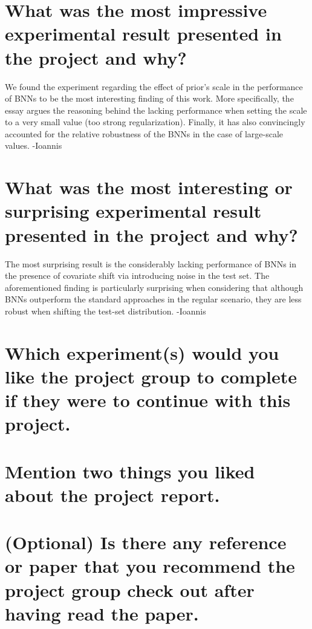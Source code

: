 \documentclass{article}
\begin{document}
\section{What was the most impressive experimental result presented in the project and why?}
We found the experiment regarding the effect of prior’s scale in the performance of BNNs to be the most interesting finding of this work. More specifically, the essay argues the reasoning behind the lacking performance when setting the scale to a very small value (too strong regularization). Finally, it has also convincingly accounted for the relative robustness of the BNNs in the case of large-scale values. -Ioannis

\section{What was the most interesting or surprising experimental result presented in the project and why?}
The most surprising result is the considerably lacking performance of BNNs in the presence of covariate shift via introducing noise in the test set. The aforementioned finding is particularly surprising when considering that although BNNs outperform the standard approaches in the regular scenario, they are less robust when shifting the test-set distribution. -Ioannis

\section{Which experiment(s) would you like the project group to complete if they were to continue with this project.}

\section{Mention two things you liked about the project report.}

\section{(Optional) Is there any reference or paper that you recommend the project group check out after having read the paper.}
\end{document}
